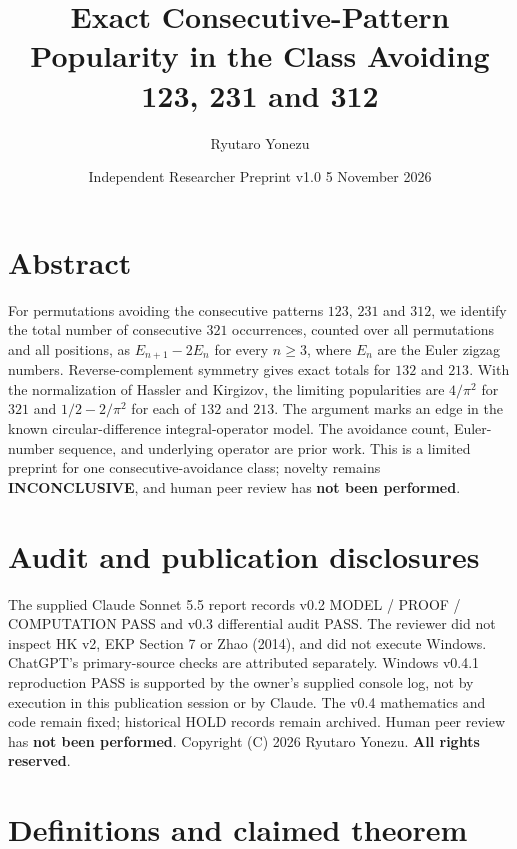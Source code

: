 \documentclass[
  11pt,
]{article}
\title{Exact Consecutive-Pattern Popularity in the Class Avoiding 123,
231 and 312}
\author{Ryutaro Yonezu}
\date{Independent Researcher \textbar{} Preprint v1.0 \textbar{} 5
November 2026}
\let\oldsection\section
\renewcommand{\section}{\needspace{5\baselineskip}\oldsection}
\begin{document}
\maketitle

\section*{Abstract}\label{abstract}

For permutations avoiding the consecutive patterns \(123\), \(231\) and
\(312\), we identify the total number of consecutive \(321\)
occurrences, counted over all permutations and all positions, as
\(E_{n+1}-2E_n\) for every \(n\geq3\), where \(E_n\) are the Euler
zigzag numbers. Reverse-complement symmetry gives exact totals for
\(132\) and \(213\). With the normalization of Hassler and Kirgizov, the
limiting popularities are \(4/\pi^2\) for \(321\) and \(1/2-2/\pi^2\)
for each of \(132\) and \(213\). The argument marks an edge in the known
circular-difference integral-operator model. The avoidance count,
Euler-number sequence, and underlying operator are prior work. This is a
limited preprint for one consecutive-avoidance class; novelty remains
\textbf{INCONCLUSIVE}, and human peer review has \textbf{not been
performed}.

\section*{Audit and publication
disclosures}\label{audit-and-publication-disclosures}

The supplied Claude Sonnet 5.5 report records v0.2 MODEL / PROOF /
COMPUTATION PASS and v0.3 differential audit PASS. The reviewer did not
inspect HK v2, EKP Section 7 or Zhao (2014), and did not execute
Windows. ChatGPT's primary-source checks are attributed separately.
Windows v0.4.1 reproduction PASS is supported by the owner's supplied
console log, not by execution in this publication session or by Claude.
The v0.4 mathematics and code remain fixed; historical HOLD records
remain archived. Human peer review has \textbf{not been performed}.
Copyright (C) 2026 Ryutaro Yonezu. \textbf{All rights reserved}.

\section{Definitions and claimed
theorem}\label{definitions-and-claimed-theorem}
\end{document}
